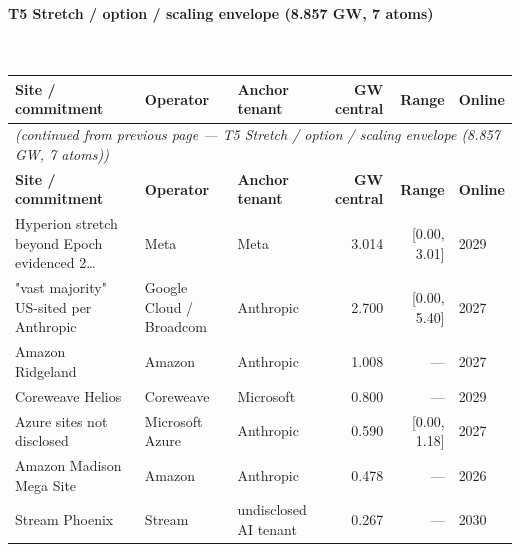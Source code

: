 \paragraph{\textbf{T5 Stretch / option / scaling envelope (8.857 GW, 7 atoms)}}~\\[0.3em]
\noindent\begin{small}
\begin{longtable}{@{}p{4.5cm} p{2.4cm} p{2.4cm} r r p{1.8cm}@{}}
\toprule
\textbf{Site / commitment} & \textbf{Operator} & \textbf{Anchor tenant} & \textbf{GW central} & \textbf{Range} & \textbf{Online} \\
\midrule
\endfirsthead
\multicolumn{6}{l}{\textit{(continued from previous page — T5 Stretch / option / scaling envelope (8.857 GW, 7 atoms))}} \\
\toprule
\textbf{Site / commitment} & \textbf{Operator} & \textbf{Anchor tenant} & \textbf{GW central} & \textbf{Range} & \textbf{Online} \\
\midrule
\endhead
\bottomrule
\endfoot

Hyperion stretch beyond Epoch evidenced 2… & Meta & Meta & 3.014 & [0.00, 3.01] & 2029 \\

"vast majority" US-sited per Anthropic & Google Cloud / Broadcom & Anthropic & 2.700 & [0.00, 5.40] & 2027 \\

Amazon Ridgeland & Amazon & Anthropic & 1.008 & — & 2027 \\

Coreweave Helios & Coreweave & Microsoft & 0.800 & — & 2029 \\

Azure sites not disclosed & Microsoft Azure & Anthropic & 0.590 & [0.00, 1.18] & 2027 \\

Amazon Madison Mega Site & Amazon & Anthropic & 0.478 & — & 2026 \\

Stream Phoenix & Stream & undisclosed AI tenant & 0.267 & — & 2030 \\

\end{longtable}\end{small}


